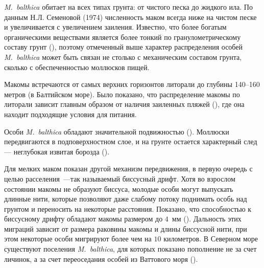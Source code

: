\textit{M.~balthica} обитает на всех типах грунта: от чистого песка до жидкого ила. 
По данным Н.Л. Семеновой (1974) численность маком всегда ниже на чистом песке и увеличивается с увеличением заиления. 
Известно, что более богатым органическими веществами является более тонкий по гранулометрическому составу грунт (\cite{Bubnova_1972}), поэтому отмеченный выше характер распределения особей \textit{M.~balthica} может быть связан не столько с механическим составом грунта, сколько с обеспеченностью моллюсков пищей.

Макомы встречаются от самых верхних горизонтов литорали до глубины 140–160 метров (в Балтийском море). 
Было показано, что распределение макомы по литорали зависит главным образом от наличия заиленных пляжей (\cite{Semenova_1974}), где она находит подходящие условия для питания. 
	
Особи \textit{M.~balthica} обладают значительной подвижностью (\cite{Sveshnikov_1963}). 
Моллюски передвигаются в подповерхностном слое, и на грунте остается характерный след --- неглубокая извитая борозда (\cite{Naumov_2006}). 

Для мелких маком показан другой механизм передвижения, в первую очередь с целью расселения~---так называемый биссусный дрифт. 
Хотя во взрослом состоянии макомы не образуют биссуса, молодые особи могут выпускать длинные нити, которые позволяют даже слабому потоку поднимать особь над грунтом и переносить на некоторые расстояния. 
Показано, что способностью к биссусному дрифту обладают макомы размером до $4$~мм (\cite{Armonies_Hellwig-Armonies_1992}). 
Дальность этих миграций зависит от размера раковины макомы и длины биссусной нити, при этом некоторые особи мигрируют более чем на $10$ километров. 
В Северном море существуют поселения \textit{M.~balthica}, для которых показано пополнение не за счет личинок, а за счет переоседания особей из Ваттового моря (\cite{Beukema_deVlas_1989}).



